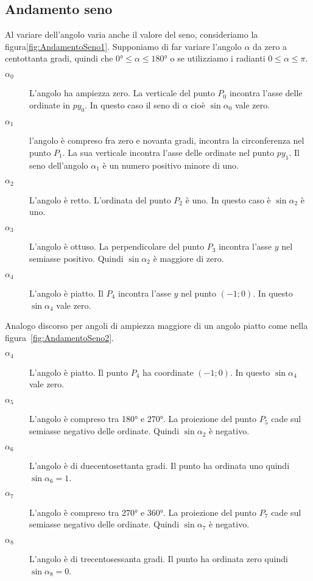 \subsection{Andamento seno}
\label{subs:AndamentoSeno}
Al variare dell'angolo varia anche il valore del seno, consideriamo la figura\nobs\vref{fig:AndamentoSeno1}. Supponiamo di far variare l'angolo $\alpha$ da zero a centottanta gradi, quindi che $\ang{0}\leq\alpha\leq\ang{180}$ o se utilizziamo i radianti $0\leq\alpha\leq\pi$. 
\begin{description}
	\item[$\alpha_0$] L'angolo ha ampiezza zero. La verticale del punto $P_0$  incontra l'asse delle ordinate in $py_0$. In questo caso il seno di $\alpha$ cioè $\sin\alpha_0$ vale zero.
	\item [$\alpha_1$] l'angolo è compreso fra zero e novanta gradi, incontra la circonferenza nel punto $P_1$. La sua verticale incontra l'asse delle ordinate nel punto $py_1$. Il seno dell'angolo $\alpha_1$ è un numero positivo minore di uno.
	\item [$\alpha_2$] L'angolo  è retto. L'ordinata del punto $P_2$ è uno. In questo caso  è   $\sin\alpha_2$ è uno. 
	\item [$\alpha_3$]  L'angolo è ottuso. La perpendicolare del punto $P_3$ incontra  l'asse $y$ nel semiasse positivo. Quindi $\sin\alpha_2$ è maggiore di zero.
	\item [$\alpha_4$] L'angolo  è  piatto. Il  $P_4$ incontra l'asse $y$ nel punto $(-1;0)$. In questo  $\sin\alpha_4$ vale zero.
\end{description}
Analogo discorso per angoli di ampiezza  maggiore di un angolo  piatto come nella figura~\vref{fig:AndamentoSeno2}.
\begin{description}
	\item [$\alpha_4$] L'angolo è piatto. Il punto  $P_4$ ha coordinate  $(-1;0)$. In questo  $\sin\alpha_4$ vale zero.
	\item [$\alpha_5$] L'angolo è compreso tra \ang{180} e \ang{270}. La proiezione del punto $P_5$ cade sul semiasse negativo delle ordinate. Quindi $\sin\alpha_2$ è negativo.
	\item [$\alpha_6$] L'angolo è di duecentosettanta gradi. Il punto ha ordinata uno quindi  $\sin\alpha_6=1$.
	\item [$\alpha_7$] L'angolo è compreso tra \ang{270} e \ang{360}. La proiezione del punto $P_7$ cade sul semiasse negativo delle ordinate. Quindi $\sin\alpha_7$ è negativo.
	\item [$\alpha_8$] L'angolo è di trecentosessanta gradi. Il punto ha ordinata zero quindi  $\sin\alpha_8=0$.
\end{description}
